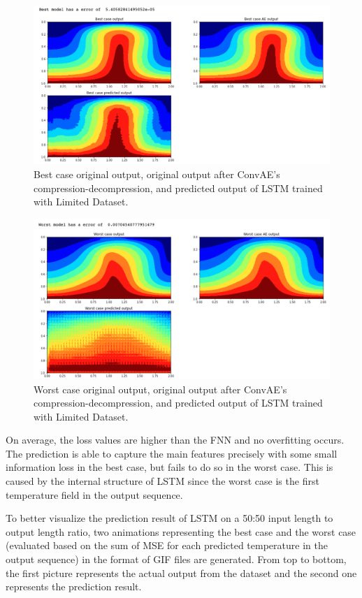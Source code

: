 \begin{figure}[H]
    \caption{Best case original output, original output after ConvAE's compression-decompression, and predicted output of LSTM trained with Limited Dataset.}
    \includegraphics[scale=0.5]{figures/mantle_convection_images/limited_dataset/LSTM_Best.png}
\end{figure}

\begin{figure}[H]
    \caption{Worst case original output, original output after ConvAE's compression-decompression, and predicted output of LSTM trained with Limited Dataset.}
    \includegraphics[scale=0.5]{figures/mantle_convection_images/limited_dataset/LSTM_Worst.png}
\end{figure}

On average, the loss values are higher than the FNN and no overfitting occurs. The prediction is able to capture the main features precisely with some small information loss in the best case, but fails to do so in the worst case. This is caused by the internal structure of LSTM since the worst case is the first temperature field in the output sequence.

To better visualize the prediction result of LSTM on a 50:50 input length to output length ratio, two animations representing the best case and the worst case (evaluated based on the sum of MSE for each predicted temperature in the output sequence) in the format of GIF files are generated. From top to bottom, the first picture represents the actual output from the dataset and the second one represents the prediction result.

